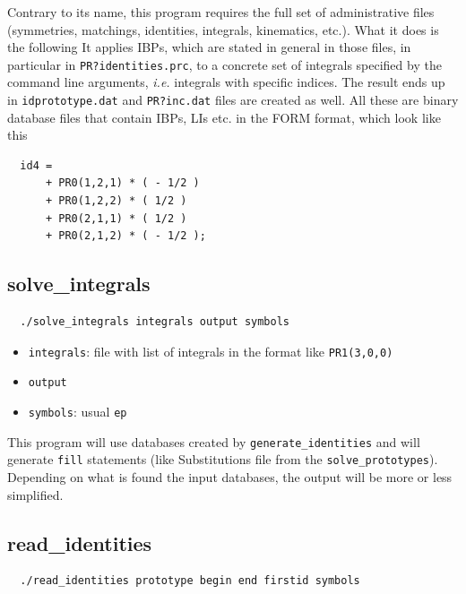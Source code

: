 \documentclass[a4paper,11pt]{article}
\begin{document}
Contrary to its name, this program requires the full set of administrative files
(symmetries, matchings, identities, integrals, kinematics, etc.). What it does
is the following It applies IBPs, which are stated in general in those files, in
particular in \verb+PR?identities.prc+, to a concrete set of integrals specified
by the command line arguments, {\it i.e.} integrals with specific indices.
%
The result ends up in \verb+idprototype.dat+ and \verb+PR?inc.dat+ files are
created as well. All these are binary database files that contain IBPs, LIs
etc. in the FORM format, which look like this

\begin{verbatim}
  id4 = 
      + PR0(1,2,1) * ( - 1/2 )
      + PR0(1,2,2) * ( 1/2 )
      + PR0(2,1,1) * ( 1/2 )
      + PR0(2,1,2) * ( - 1/2 );
\end{verbatim}


\subsection{solve\_integrals}

\begin{verbatim}
  ./solve_integrals integrals output symbols
\end{verbatim}


\begin{itemize}
  \item
   \verb+integrals+: file with list of integrals in the format like
   \verb+PR1(3,0,0)+
  \item
   \verb+output+
  \item
   \verb+symbols+: usual \verb+ep+
\end{itemize}

This program will use databases created by \verb+generate_identities+ and
will generate \verb+fill+ statements (like Substitutions file from the
\verb+solve_prototypes+). Depending on what is found the input databases, the
output will be more or less simplified.


\subsection{read\_identities}

\begin{verbatim}
  ./read_identities prototype begin end firstid symbols
\end{verbatim}
\end{document}
